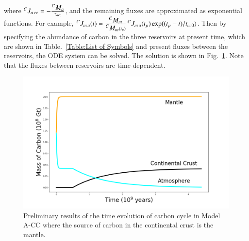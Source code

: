 where $\mbox{${^CJ_{a\,cc}}$} = -\frac{\mbox{${^CM_{a}}$}}{\tau_{acc}}$, and the remaining fluxes are approximated as exponential functions. For example, $\mbox{${^CJ_{m\,a}}$}(t) = \frac{\mbox{${^CM_{m}}$}}{\mbox{${^CM_{m}}$}(t_p)}\, \mbox{${^CJ_{m\,a}}$}(t_p) \exp((t_p - t)/t_{cc0})$. Then by specifying the abundance of carbon in the three reservoirs at present time, which are shown in Table.~\ref{Table:List of Symbols} and present fluxes between the reservoirs, the ODE system can be solved. The solution is shown in Fig.~\ref{Fig:ModelA-CC}. Note that the fluxes between reservoirs are time-dependent. 


\begin{figure}[h!]
  \centering
  \includegraphics[scale=0.4]{Figures/ModelM-CC.png}
  \caption{Preliminary results of the time evolution of carbon cycle in Model A-CC where the source of carbon in the continental crust is the mantle.}
  \label{Fig:ModelA-CC}
\end{figure}

